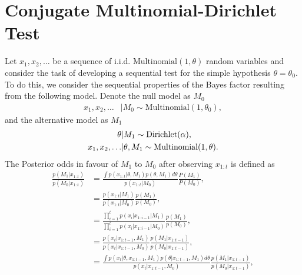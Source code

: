 \documentclass[11pt]{article}
\begin{document}

\section{Conjugate Multinomial-Dirichlet Test}
\label{sec:srm_testing}
Let $x_1, x_2 ,\dots $ be a sequence of i.i.d. $\text{Multinomial}(1,\theta)$ random variables and consider the task of developing a sequential test for the simple hypothesis $\theta=\theta_0$. To do this, we consider the sequential properties of the Bayes factor resulting from the following model. Denote the null model as $M_0$ 
\begin{align}
    x_1, x_2, \dots &| M_0 \sim \text{Multinomial}(1,\theta_0),
\end{align}
and the alternative model as $M_1$
\begin{align}
  \theta &| M_1 \sim \text{Dirichlet}(\alpha),\\
  x_1, x_2, \dots &| \theta, M_1 \sim \text{Multinomial}(1,\theta).\notag
\end{align}
The Posterior odds in favour of $M_1$ to $M_0$ after observing $x_{1:t}$ is defined as
\begin{align}
  \label{eq:general_posterior_odds}
  \frac{p(M_1|x_{1:t})}{p(M_0|x_{1:t})}  &= \frac{\int p(x_{1:t}|\theta,M_1)p(\theta,M_1)d\theta}{p(x_{1:t}|M_0)}\frac{P(M_1)}{P(M_0)},\\
                      &=\frac{p(x_{1:t}|M_1)}{p(x_{1:t}|M_0)}\frac{p(M_1)}{p(M_0)},\\
                      &=\frac{\prod_{i=1}^{t}p(x_i|x_{1:i-1}|M_1)}{\prod_{i=1}^{t}p(x_i|x_{1:i-1}|M_0)}\frac{p(M_1)}{p(M_0)},\\
                      &=\frac{p(x_t|x_{1:t-1},M_1)}{p(x_t|x_{1:t-1},M_0)} \frac{p(M_1|x_{1:t-1})}{p(M_0|x_{1:t-1})},\\
    &=\frac{\int p(x_t|\theta,x_{1:t-1},M_1)p(\theta|x_{1:t-1},M_1)d\theta}{p(x_t|x_{1:t-1},M_0)}  \frac{p(M_1|x_{1:t-1})}{p(M_0|x_{1:t-1})} ,
\end{align}
\end{document}
